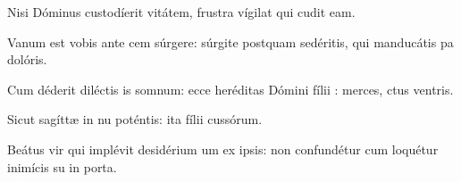 \item {}

\item Nisi Dóminus custodíerit vitátem,\psstar{} frustra vígilat qui cudit eam.

\item Vanum est vobis ante cem súrgere:\psstar{} súrgite postquam sedéritis, qui manducátis pa dolóris.

\item Cum déderit diléctis is somnum:\psstar{} ecce heréditas Dómini fílii : merces, ctus ventris.

\item Sicut sagíttæ in nu poténtis:\psstar{} ita fílii cussórum.

\item Beátus vir qui implévit desidérium um ex ipsis:\psstar{} non confundétur cum loquétur inimícis su in porta.

